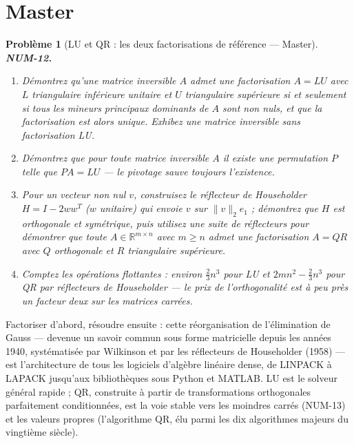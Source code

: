 \documentclass[11pt]{article}
\newtheorem{problem}{Problème}
\begin{document}
\bigskip


\section*{Master}

\begin{problem}[{LU et QR : les deux factorisations de référence --- Master}]
\textbf{NUM-12.} \begin{enumerate}
\item[(a)] Démontrez qu'une matrice inversible $A$ admet une
factorisation $A = LU$ avec $L$ triangulaire inférieure unitaire et $U$
triangulaire supérieure si et seulement si tous les mineurs principaux dominants de
$A$ sont non nuls, et que la factorisation est alors unique. Exhibez une matrice
inversible sans factorisation LU.
\item[(b)] Démontrez que pour toute matrice inversible $A$ il existe une permutation
$P$ telle que $PA = LU$ --- le pivotage sauve toujours l'existence.
\item[(c)] Pour un vecteur
non nul $v$, construisez le réflecteur de Householder $H = I - 2ww^T$ ($w$
unitaire) qui envoie $v$ sur $\|v\|_2 e_1$ ; démontrez que $H$ est orthogonale
et symétrique, puis utilisez une suite de réflecteurs pour démontrer que toute
$A \in \mathbb{R}^{m \times n}$ avec $m \ge n$ admet une factorisation
$A = QR$ avec $Q$ orthogonale et $R$ triangulaire supérieure.
\item[(d)] Comptez les opérations flottantes : environ $\tfrac{2}{3}n^3$ pour LU
et $2mn^2 - \tfrac{2}{3}n^3$ pour QR par réflecteurs de Householder --- le prix de
l'orthogonalité est à peu près un facteur deux sur les matrices carrées.
\end{enumerate}

\end{problem}

\noindent Factoriser d'abord, résoudre ensuite : cette réorganisation de
l'élimination de Gauss --- devenue un savoir commun sous forme matricielle depuis les
années 1940, systématisée par Wilkinson et par les réflecteurs de Householder (1958) ---
est l'architecture de tous les logiciels d'algèbre linéaire dense, de LINPACK à LAPACK
jusqu'aux bibliothèques sous Python et MATLAB. LU est le solveur général rapide ; QR,
construite à partir de transformations orthogonales parfaitement conditionnées, est la
voie stable vers les moindres carrés (NUM-13) et les valeurs propres (l'algorithme QR,
élu parmi les dix algorithmes majeurs du vingtième siècle).
\end{document}
